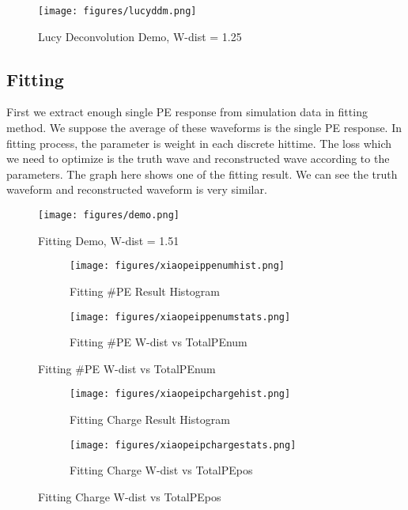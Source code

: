 \begin{figure}[H]
    \centering
    \caption{Lucy Deconvolution Demo, W-dist = 1.25}
    \texttt{[image: figures/lucyddm.png]}
\end{figure}

\subsection{Fitting}
First we extract enough single PE response from simulation data in fitting method. We suppose the average of these waveforms is the single PE response. In fitting process, the parameter is weight in each discrete hittime. The loss which we need to optimize is the truth wave and reconstructed wave according to the parameters. The graph here shows one of the fitting result. We can see the truth waveform and reconstructed waveform is very similar. 

\begin{figure}
    \centering
    \caption{Fitting Demo, W-dist = 1.51}
    \texttt{[image: figures/demo.png]}
\end{figure}

\begin{figure}[H]
\begin{minipage}{.5\textwidth}
\begin{figure}[H]
    \centering
        \texttt{[image: figures/xiaopeippenumhist.png]}
    \caption{Fitting \#PE Result Histogram}
\end{figure}
\end{minipage}
\begin{minipage}{.5\textwidth}
\begin{figure}[H]
    \centering
        \texttt{[image: figures/xiaopeippenumstats.png]}
    \caption{Fitting \#PE W-dist vs TotalPEnum}
\end{figure}
\end{minipage}
\end{figure}
\begin{figure}[H]
\begin{minipage}{.5\textwidth}
\begin{figure}[H]
    \centering
        \texttt{[image: figures/xiaopeipchargehist.png]}
    \caption{Fitting Charge Result Histogram}
\end{figure}
\end{minipage}
\begin{minipage}{.5\textwidth}
\begin{figure}[H]
    \centering
        \texttt{[image: figures/xiaopeipchargestats.png]}
    \caption{Fitting Charge W-dist vs TotalPEpos}
\end{figure}
\end{minipage}
\end{figure}

